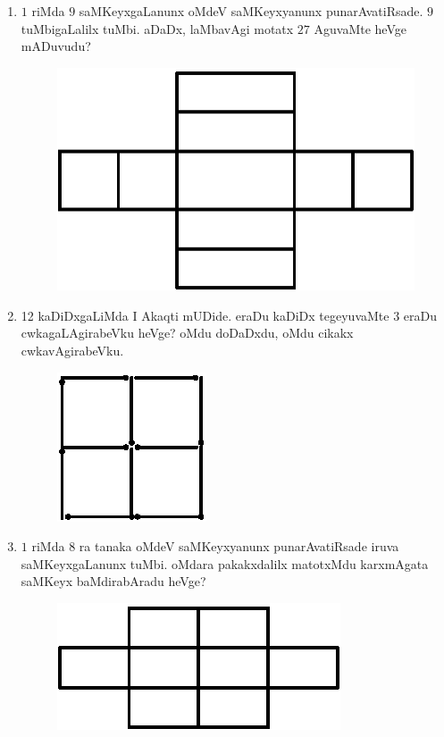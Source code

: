\begin{enumerate}
\item $1$ riMda $9$ saMKeyxgaLanunx oMdeV saMKeyxyanunx punarAvatiRsade. $9$ tuMbigaLalilx tuMbi. aDaDx, laMbavAgi motatx $27$ AguvaMte heVge mADuvudu?
\begin{figure}[H]
\centering
\includegraphics{src/figures/exr10.eps}
\end{figure}

\item 12 kaDiDxgaLiMda I Akaqti mUDide. eraDu kaDiDx tegeyuvaMte $3$ eraDu cwkagaLAgirabeVku heVge? oMdu doDaDxdu, oMdu cikakx  cwkavAgirabeVku.
\begin{figure}[H]
\centering
\includegraphics{src/figures/exr11.eps}
\end{figure}


\item $1$ riMda $8$ ra tanaka oMdeV saMKeyxyanunx punarAvatiRsade iruva saMKeyxgaLanunx tuMbi. oMdara pakakxdalilx matotxMdu karxmAgata saMKeyx baMdirabAradu heVge?
\begin{figure}[H]
\centering
\includegraphics{src/figures/exr12.eps}
\end{figure}


\end{enumerate}
